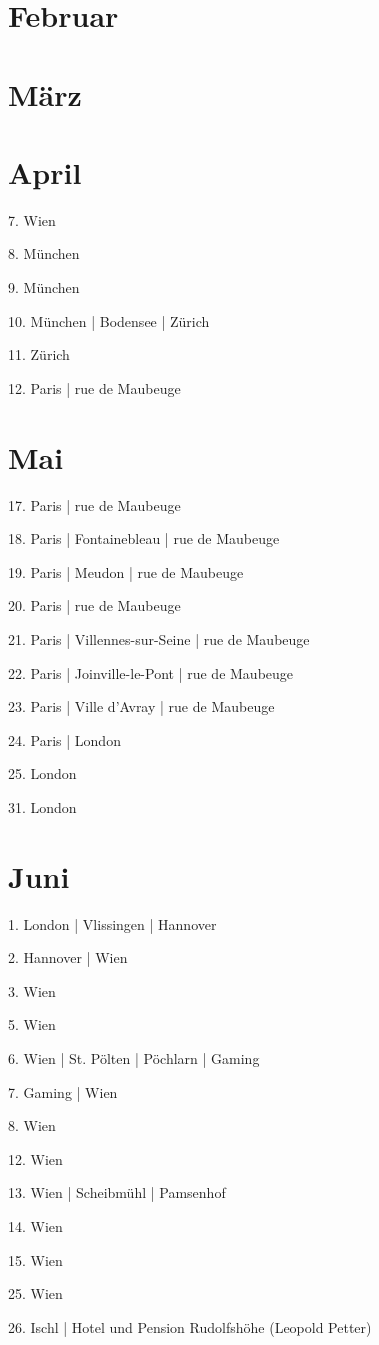 \documentclass[twoside=false,titlepage=false,open=any, parskip=never, fontsize=10pt, headings=small, chapterprefix=false, appendixprefix=false, DIV=15]{scrbook}
\begin{document}
\begin{multicols}{3}
            \section*{Februar}
            \section*{März}
            \section*{April}
            7. Wien\par
            8. München\par
            9. München\par
            10. München | Bodensee | Zürich\par
            11. Zürich\par
            12. Paris | rue de Maubeuge\par
            \section*{Mai}
            17. Paris | rue de Maubeuge\par
            18. Paris | Fontainebleau | rue de Maubeuge\par
            19. Paris | Meudon | rue de Maubeuge\par
            20. Paris | rue de Maubeuge\par
            21. Paris | Villennes-sur-Seine | rue de Maubeuge\par
            22. Paris | Joinville-le-Pont | rue de Maubeuge\par
            23. Paris | Ville d'Avray | rue de Maubeuge\par
            24. Paris | London\par
            25. London\par
            31. London\par
            \section*{Juni}
            1. London | Vlissingen | Hannover\par
            2. Hannover | Wien\par
            3. Wien\par
            5. Wien\par
            6. Wien | St. Pölten | Pöchlarn | Gaming\par
            7. Gaming | Wien\par
            8. Wien\par
            12. Wien\par
            13. Wien | Scheibmühl | Pamsenhof\par
            14. Wien\par
            15. Wien\par
            25. Wien\par
            26. Ischl | Hotel und Pension Rudolfshöhe (Leopold Petter)\par

\end{multicols}
\end{document}
